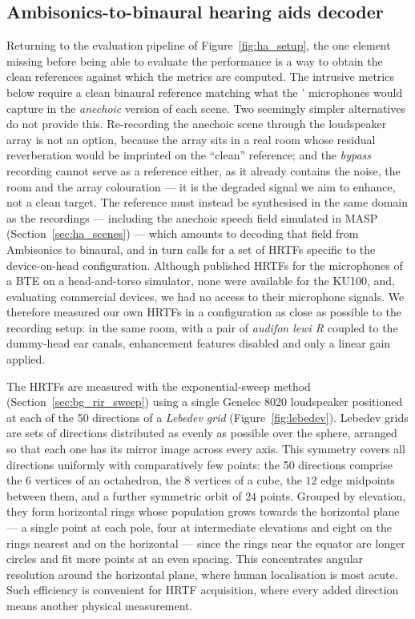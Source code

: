 \subsection{Ambisonics-to-binaural hearing aids decoder}
\label{sec:ha_bindecoder}

Returning to the evaluation pipeline of Figure~\ref{fig:ha_setup}, the one
element missing before being able to evaluate the performance is a way to obtain the clean references against which the
metrics are computed. The intrusive metrics below require a clean binaural
reference matching what the ' microphones would capture in the
\emph{anechoic} version of each scene. Two seemingly simpler alternatives do not
provide this. Re-recording the anechoic scene through the loudspeaker array is
not an option, because the array sits in a real room whose residual reverberation
would be imprinted on the ``clean'' reference; and the \emph{bypass} recording
cannot serve as a reference either, as it already contains the noise, the room
and the array colouration --- it is the degraded signal we aim to enhance, not a
clean target. The reference must instead be synthesised in the same domain as the
recordings --- including the anechoic speech field simulated in \acrshort{MASP}
(Section~\ref{sec:ha_scenes}) --- which amounts to decoding that field from
Ambisonics to binaural, and in turn calls for a set of \acrshort{HRTF}s
specific to the device-on-head configuration. Although \citet{oldenburg}
published \acrshort{HRTF}s for the microphones of a \acrshort{BTE}  on a head-and-torso simulator, none were available for the \acrshort{KU100}, and, evaluating commercial devices, we had no access to their microphone signals. We therefore measured our own \acrshort{HRTF}s in a configuration as close as possible to the recording setup: in the same room, with a pair of \emph{audifon lewi R}  coupled to the dummy-head ear canals, enhancement features disabled and only a linear gain applied.

The \acrshort{HRTF}s are measured with the exponential-sweep method
(Section~\ref{sec:bg_rir_sweep}) using a single Genelec 8020 loudspeaker
positioned at each of the 50 directions of a \emph{Lebedev grid}
(Figure~\ref{fig:lebedev}). Lebedev grids are sets of directions distributed as evenly as possible over
the sphere, arranged so that each one has its mirror image across every axis.
This symmetry covers all directions uniformly with comparatively few points:
the 50 directions comprise the $6$ vertices of an octahedron, the $8$ vertices
of a cube, the $12$ edge midpoints between them, and a further symmetric
orbit of $24$ points. Grouped by elevation, they form horizontal rings whose
population grows towards the horizontal plane --- a single point at each pole,
four at intermediate elevations and eight on the rings nearest and on the
horizontal --- since the rings near the equator are longer circles and fit
more points at an even spacing. This concentrates angular resolution around
the horizontal plane, where human localisation is most acute. Such efficiency
is convenient for \acrshort{HRTF} acquisition, where every added direction
means another physical measurement.



